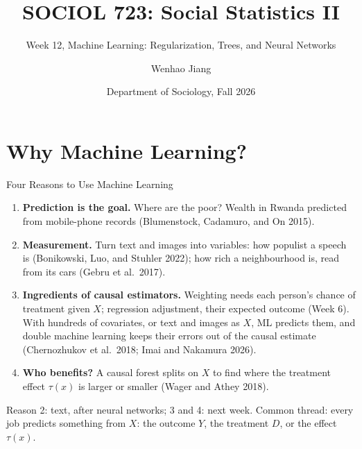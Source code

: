 \documentclass[aspectratio=169,11pt,xcolor=dvipsnames]{beamer}
\title[SOCIOL 723]{SOCIOL 723: Social Statistics II\\[-2pt]}
\subtitle{Week 12, Machine Learning: Regularization, Trees, and Neural Networks\\[-6pt]}
\author[Jiang]{Wenhao Jiang\vspace{-2.5em}}
\institute[Duke]{}
\date{Department of Sociology, Fall 2026}
\newcommand{\srcp}[1]{{\scriptsize\color{gray}(#1)}}
\begin{document}
\begin{frame}[plain]
  \titlepage
\end{frame}


\section[Why ML]{Why Machine Learning?}
\begin{frame}\sectionpage\end{frame}

\begin{frame}{Four Reasons to Use Machine Learning}
\begin{enumerate}\itemsep3pt
  \item \textbf{Prediction is the goal.} Where are the poor? Wealth in Rwanda predicted from
        mobile-phone records \srcp{Blumenstock, Cadamuro, and On 2015}.
  \item \textbf{Measurement.} Turn text and images into variables: how populist a speech
        is \srcp{Bonikowski, Luo, and Stuhler 2022}; how rich a neighbourhood is, read from
        its cars \srcp{Gebru et al.\ 2017}.
  \item \textbf{Ingredients of causal estimators.} Weighting needs each person's chance of
        treatment given $X$; regression adjustment, their expected outcome (Week 6). With
        hundreds of covariates, or text and images as $X$, ML predicts them, and double
        machine learning keeps their errors out of the causal estimate
        \srcp{Chernozhukov et al.\ 2018; Imai and Nakamura 2026}.
  \item \textbf{Who benefits?} A causal forest splits on $X$ to find where the treatment
        effect $\tau(x)$ is larger or smaller \srcp{Wager and Athey 2018}.
\end{enumerate}
\vskip2pt
{\small Reason 2: text, after neural networks; 3 and 4: next week. \alert{Common thread}: every job predicts something
from $X$: the outcome $Y$, the treatment $D$, or the effect $\tau(x)$.}
\end{frame}
\end{document}
